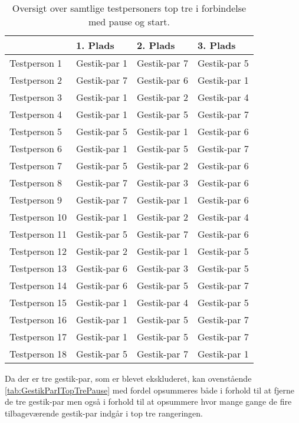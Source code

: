 \begin{table}[H]
	\centering
	\begin{tabular}{ | p{3cm} | p{3cm} | p{3cm} | p{3cm} |}
	\hline
		 & 1. Plads & 2. Plads & 3. Plads \\ \hline
		Testperson 1 & Gestik-par 1 & Gestik-par 7 & Gestik-par 5 \\ \hline
		Testperson 2 & Gestik-par 7 & Gestik-par 6 & Gestik-par 1 \\ \hline
		Testperson 3 & Gestik-par 1 & Gestik-par 2 & Gestik-par 4 \\ \hline
		Testperson 4 & Gestik-par 1 & Gestik-par 5 & Gestik-par 7 \\ \hline
		Testperson 5 & Gestik-par 5 & Gestik-par 1 & Gestik-par 6 \\ \hline
		Testperson 6 & Gestik-par 1 & Gestik-par 5 & Gestik-par 7 \\ \hline 
		Testperson 7 & Gestik-par 5 & Gestik-par 2 & Gestik-par 6 \\ \hline
		Testperson 8 & Gestik-par 7 & Gestik-par 3 & Gestik-par 6 \\ \hline
		Testperson 9 & Gestik-par 7 & Gestik-par 1 & Gestik-par 6 \\ \hline
		Testperson 10 & Gestik-par 1 & Gestik-par 2 & Gestik-par 4 \\ \hline
		Testperson 11 & Gestik-par 5 & Gestik-par 7 & Gestik-par 6 \\ \hline
		Testperson 12 & Gestik-par 2 & Gestik-par 1 & Gestik-par 5 \\ \hline
		Testperson 13 & Gestik-par 6 & Gestik-par 3 & Gestik-par 5 \\ \hline
		Testperson 14 & Gestik-par 6 & Gestik-par 5 & Gestik-par 7 \\ \hline
		Testperson 15 & Gestik-par 1 & Gestik-par 4 & Gestik-par 5 \\ \hline
		Testperson 16 & Gestik-par 1 & Gestik-par 5 & Gestik-par 7 \\ \hline
		Testperson 17 & Gestik-par 1 & Gestik-par 5 & Gestik-par 7 \\ \hline
		Testperson 18 & Gestik-par 5 & Gestik-par 7 & Gestik-par 1 \\ \hline
	\end{tabular}
	\caption{Oversigt over samtlige testpersoners top tre i forbindelse med pause og start.}
	\label{tab:GestikParITopTrePause}
\end{table}
\noindent
%
Da der er tre gestik-par, som er blevet ekskluderet, kan ovenstående  \autoref{tab:GestikParITopTrePause} med fordel opsummeres både i forhold til at fjerne de tre gestik-par men også i forhold til at opsummere hvor mange gange de fire tilbageværende gestik-par indgår i top tre rangeringen. 

